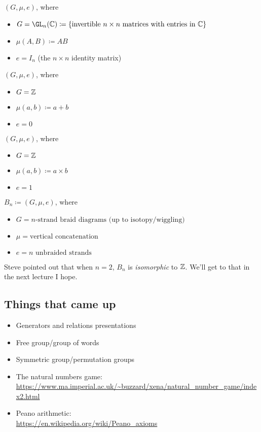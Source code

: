 \begin{example}
    $(G,\mu,e)$, where
    \begin{itemize}
        \item $G = \GL_n(\C) \coloneq \{ \text{invertible $n\times n$ matrices with entries in $\C$}\}$
        \item $\mu(A,B) \coloneq AB$
        \item $e = I_n$ (the $n\times n$ identity matrix)
    \end{itemize}
\end{example}

\begin{example}[Integers]
    $(G,\mu,e)$, where
    \begin{itemize}
        \item $G = \mathbb{Z}$
        \item $\mu(a,b) \coloneq a+b$
        \item $e = 0$
    \end{itemize}
\end{example}

\begin{example}
    $(G,\mu,e)$, where
    \begin{itemize}
        \item $G = \mathbb{Z}$
        \item $\mu(a,b) \coloneq a\times b$
        \item $e = 1$
    \end{itemize}
\end{example}

\begin{example}
    $B_n \coloneq (G,\mu,e)$, where
    \begin{itemize}
        \item $G = \text{$n$-strand braid diagrams (up to isotopy/wiggling)}$
        \item $\mu = \text{vertical concatenation}$
        \item $e = \text{$n$ unbraided strands}$
    \end{itemize}
    Steve pointed out that when $n=2$, $B_n$ is {\it isomorphic} to $\mathbb{Z}$.
    We'll get to that in the next lecture I hope.
\end{example}

\subsection{Things that came up}
\begin{itemize}
    \item Generators and relations presentations
    \item Free group/group of words
    \item Symmetric group/permutation groups
    \item The natural numbers game: \\ 
    \url{https://www.ma.imperial.ac.uk/~buzzard/xena/natural_number_game/index2.html}
    \item Peano arithmetic: \\ 
    \url{https://en.wikipedia.org/wiki/Peano_axioms}
\end{itemize}